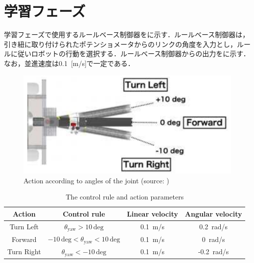
\section{学習フェーズ}

  学習フェーズで使用するルールベース制御器をに示す．ルールベース制御器は，引き紐に取り付けられたポテンショメータからのリンクの角度を入力とし，ルールに従いロボットの行動を選択する．ルールベース制御器からの出力をに示す．なお，並進速度は0.1 \,[m/s]で一定である．

  \begin{figure}[h]
    \centering
    \includegraphics[keepaspectratio, scale=0.70] {images/pdf/okada_rule-based_contoroller}
    \caption[Action according to angles of the joint]{Action according to angles of the joint (source: \cite{okada})}
    \label{Fig:okada_rule-based_contoroller}
  \end{figure}

  \begin{table}[ht]
    \caption{The control rule and action parameters}
    \label{tab:actions_control_parameters}
    \centering
    \begin{tabular}{cccc}
    \hline
    Action & Control rule & Linear velocity & Angular velocity \\ 
    \hline
    \hline
    Turn Left & $\theta_{\mathrm{yaw}} > 10 \, \mathrm{deg}$ & 0.1 \,m/s & 0.2 \,rad/s \\ 
    Forward & $-10 \, \mathrm{deg} < \theta_{\mathrm{yaw}} < 10 \, \mathrm{deg}$ & 0.1 \,m/s & 0 \,rad/s \\ 
    Turn Right & $\theta_{\mathrm{yaw}} < -10 \, \mathrm{deg}$ & 0.1 \,m/s & -0.2 \,rad/s \\ 
    \hline
    \end{tabular}
    \end{table}
  
\newpage